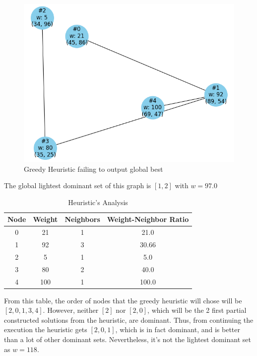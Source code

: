 \documentclass[mirror,times]{revdetua}
\begin{document}
\begin{figure}[h]
    \centering
    \includegraphics[scale=0.2]{resources/heuristicFail.png}
    \caption{\label{fig:h_fail}Greedy Heuristic failing to output global best}
\end{figure}

The global lightest dominant set of this graph is $[1,2]$ with $w=97.0$

\begin{table}[ht]
    \centering
    \begin{tabular}{|c|c|c|c|}
        \hline
        \textbf{Node} & \textbf{Weight} & \textbf{Neighbors} & \textbf{Weight-Neighbor Ratio} \\
        \hline
        0 & 21 & 1 & 21.0 \\
        \hline
        1 & 92 & 3 & 30.66  \\
        \hline
        2 & 5 & 1 & 5.0  \\
        \hline
        3 & 80 & 2 & 40.0  \\
        \hline
        4 & 100 & 1 & 100.0  \\
        \hline
    \end{tabular}
    \caption{Heuristic's Analysis}
\end{table}

From this table, the order of nodes that the greedy heuristic will chose will be 
$[2,0,1,3,4]$. However, neither $[2]$ nor $[2,0]$, which will be the 2 first
partial constructed solutions from the heuristic, are dominant. Thus, from
continuing the execution the heuristic gets $[2,0,1]$, which is in fact
dominant, and is better than a lot of other dominant sets. Nevertheless, it's
not the lightest dominant set as $w=118$.
\end{document}
